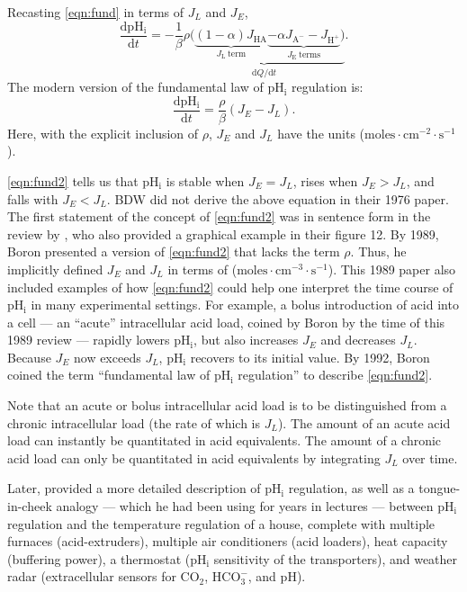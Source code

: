 \documentclass[fleqn,10pt]{physiome}
\begin{document}
Recasting \autoref{eqn:fund} in terms of $J_L$ and $J_E$,
\begin{equation}
\dfrac{\mathrm{dpH_i}}{\mathrm{d}t}=-\dfrac{1}{\beta}\underbrace{\rho\Big(\underbrace{(1-\alpha)J_\mathrm{HA}}_{J_\mathrm{L}~\mathrm{term}}\underbrace{-\alpha J_\mathrm{A^-}-J_\mathrm{H^+}}_{J_\mathrm{E}~\mathrm{terms}}\Big)}_{{\mathrm{d}Q}/{\mathrm{d}t}}.
\label{eqn:fund1}
\end{equation}
The modern version of the fundamental law of $\mathrm{pH_i}$ regulation is:
\begin{equation}
\dfrac{\mathrm{dpH_i}}{\mathrm{d}t}=\dfrac{\rho}{\beta}(J_E-J_L).
\label{eqn:fund2}
\end{equation}
Here, with the explicit inclusion of $\rho$, $J_E$ and $J_L$ have the units ($\mathrm{moles}\cdot\mathrm{cm^{-2}\cdot s^{-1}}$).

\autoref{eqn:fund2} tells us that $\mathrm{pH_i}$ is stable when $J_E=J_L$, rises when $J_E>J_L$, and falls with $J_E<J_L$. BDW did not derive the above equation in their 1976 paper. The first statement of the concept of \autoref{eqn:fund2} was in sentence form in the review by \cite{roos1981intracellular}, who also provided a graphical example in their figure 12. By 1989, Boron presented a version of \autoref{eqn:fund2} that lacks the term $\rho$. Thus, he implicitly defined $J_E$ and $J_L$ in terms of ($\mathrm{moles}\cdot\mathrm{cm^{-3}\cdot s^{-1}}$). This 1989 paper also included examples of how \autoref{eqn:fund2} could help one interpret the time course of $\mathrm{pH_i}$ in many experimental settings. For example, a bolus introduction of acid into a cell --- an ``acute'' intracellular acid load, coined by Boron by the time of this 1989 review --- rapidly lowers $\mathrm{pH_i}$, but also increases $J_E$ and decreases $J_L$. Because $J_E$ now exceeds $J_L$, $\mathrm{pH_i}$ recovers to its initial value. By 1992, Boron coined the term ``fundamental law of $\mathrm{pH_i}$ regulation'' to describe \autoref{eqn:fund2}.

Note that an acute or bolus intracellular acid load is to be distinguished from a chronic intracellular load (the rate of which is $J_L$). The amount of an acute acid load can instantly be quantitated in acid equivalents. The amount of a chronic acid load can only be quantitated in acid equivalents by integrating $J_L$ over time.

Later, \cite{boron2004regulation} provided a more detailed description of $\mathrm{pH_i}$ regulation, as well as a tongue-in-cheek analogy --- which he had been using for years in lectures --- between $\mathrm{pH_i}$ regulation and the temperature regulation of a house, complete with multiple furnaces (acid-extruders), multiple air conditioners (acid loaders), heat capacity (buffering power), a thermostat ($\mathrm{pH_i}$ sensitivity of the transporters), and weather radar (extracellular sensors for $\mathrm{CO_2}$, $\mathrm{HCO_3^-}$, and $\mathrm{pH}$).
\end{document}
